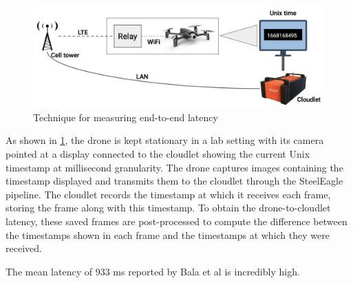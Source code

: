 \begin{figure}[htbp]
\centerline{\includegraphics[width = .8\textwidth]{figs/mtp_pipeline.png}}
\caption{Technique for measuring end-to-end latency}
\label{fig:latency-measuring-technique}
\end{figure}
As shown in \cref{fig:latency-measuring-technique}, the drone is kept
stationary in a lab setting with its camera pointed at a display connected to
the cloudlet showing the current Unix timestamp at millisecond granularity. The
drone captures images containing the timestamp displayed and transmits them to
the cloudlet through the SteelEagle pipeline. The cloudlet records the
timestamp at which it receives each frame, storing the frame along with this
timestamp. To obtain the drone-to-cloudlet latency, these saved frames are
post-processed to compute the difference between the timestamps shown in each
frame and the timestamps at which they were received.

The mean latency of 933 ms reported by Bala et al is incredibly high.


